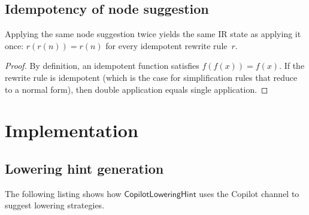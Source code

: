 \documentclass[11pt]{article}
\newcommand{\LowHint}{\mathsf{CopilotLoweringHint}}
\begin{document}
\subsection{Idempotency of node suggestion}

\begin{lemma}%
\label{lem:nodeidempotent}
Applying the same node suggestion twice yields the same
IR state as applying it once:
$r(r(n)) = r(n)$ for every idempotent rewrite rule~$r$.
\end{lemma}
\begin{proof}
By definition, an idempotent function satisfies
$f(f(x)) = f(x)$.  If the rewrite rule is idempotent
(which is the case for simplification rules that reduce
to a normal form), then double application equals single
application.
\end{proof}

\section{Implementation}\label{sec:code}

\subsection{Lowering hint generation}

The following listing shows how $\LowHint$ uses the
Copilot channel to suggest lowering strategies.
\end{document}
